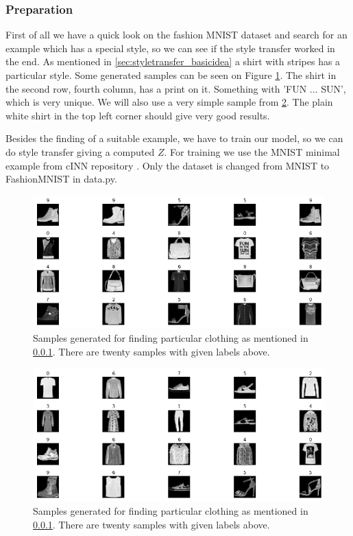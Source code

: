 \documentclass[final]{cvpr}
\begin{document}
\subsubsection{Preparation}\label{sec:styletransfer_preparation}
First of all we have a quick look on the fashion MNIST dataset and search for an example which has a special style, so we can see if the style transfer worked in the end. As mentioned in \ref{sec:styletransfer_basicidea} a shirt with stripes has a particular style. Some generated samples can be seen on Figure \ref{fig:fashion_mnist_examples}. The shirt in the second row, fourth column, has a print on it. Something with 'FUN ... SUN', which is very unique. We will also use a very simple sample from \ref{fig:fashion_mnist_examples_2}. The plain white shirt in the top left corner should give very good results. 

Besides the finding of a suitable example, we have to train our model, so we can do style transfer giving a computed $Z$. For training we use the MNIST minimal example from cINN repository \cite{main_paper_CINN}. Only the dataset is changed from MNIST to FashionMNIST in data.py.

\begin{figure}[t]
	\begin{center}
		\includegraphics[width=0.8\linewidth]{./figs/fashion_mnist/fashion_mnist_examples.png}
	\end{center}
	\caption{Samples generated for finding particular clothing as mentioned in \ref{sec:styletransfer_preparation}. There are twenty samples with given labels above. }
	\label{fig:fashion_mnist_examples}
\end{figure}

\begin{figure}[t]
	\begin{center}
		\includegraphics[width=0.8\linewidth]{./figs/fashion_mnist/fashion_mnist_examples_2.png}
	\end{center}
	\caption{Samples generated for finding particular clothing as mentioned in \ref{sec:styletransfer_preparation}. There are twenty samples with given labels above. }
	\label{fig:fashion_mnist_examples_2}
\end{figure}
\end{document}
